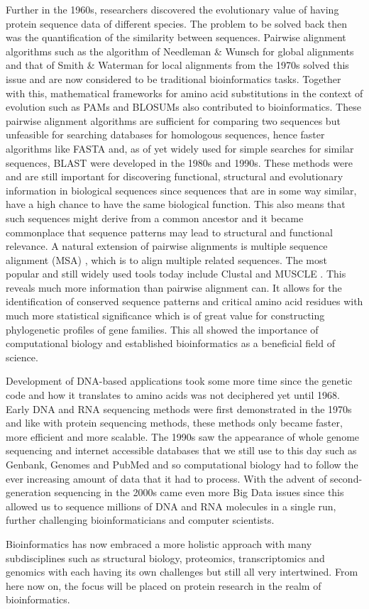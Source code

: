 Further in the 1960s, researchers discovered the evolutionary value of having protein sequence data of different species. The problem to be solved back then was the quantification of the similarity between sequences. Pairwise alignment algorithms such as the algorithm of Needleman \& Wunsch \cite{global} for global alignments and that of Smith \& Waterman \cite{local} for local alignments from the 1970s solved this issue and are now considered to be traditional bioinformatics tasks. Together with this, mathematical frameworks for amino acid substitutions in the context of evolution such as PAMs and BLOSUMs also contributed to bioinformatics. These pairwise alignment algorithms are sufficient for comparing two sequences but unfeasible for searching databases for homologous sequences, hence faster algorithms like FASTA \cite{fasta} and, as of yet widely used for simple searches for similar sequences, BLAST \cite{blast} were developed in the 1980s and 1990s. These methods were and are still important for discovering functional, structural and evolutionary information in biological sequences since sequences that are in some way similar, have a high chance to have the same biological function. This also means that such sequences might derive from a common ancestor and it became commonplace that sequence patterns may lead to structural and functional relevance. A natural extension of pairwise alignments is multiple sequence alignment (MSA) \cite{msa}, which is to align multiple related sequences. The most popular and still widely used tools today include Clustal \cite{clustal} and MUSCLE \cite{muscle}. This reveals much more information than pairwise alignment can. It allows for the identification of conserved sequence patterns and critical amino acid residues with much more statistical significance which is of great value for constructing phylogenetic profiles of gene families. This all showed the importance of computational biology and established bioinformatics as a beneficial field of science.

Development of DNA-based applications took some more time since the genetic code and how it translates to amino acids was not deciphered yet until 1968\cite{codon}. Early DNA and RNA sequencing methods were first demonstrated in the 1970s\cite{dnaseq, rna} and like with protein sequencing methods, these methods only became faster, more efficient and more scalable. The 1990s saw the appearance of whole genome sequencing and internet accessible databases that we still use to this day such as Genbank, Genomes and PubMed and so computational biology had to follow the ever increasing amount of data that it had to process. With the advent of second-generation sequencing in the 2000s came even more Big Data issues since this allowed us to sequence millions of DNA and RNA molecules in a single run, further challenging bioinformaticians and computer scientists.

Bioinformatics has now embraced a more holistic approach with many subdisciplines such as structural biology, proteomics, transcriptomics and genomics with each having its own challenges but still all very intertwined. From here now on, the focus will be placed on protein research in the realm of bioinformatics.